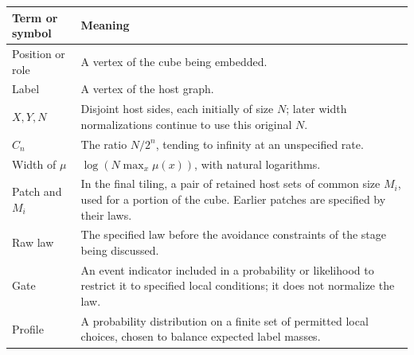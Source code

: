\begin{center}
\begin{tabular}{@{}p{.22\linewidth}p{.71\linewidth}@{}}
\toprule
Term or symbol & Meaning \\
\midrule
Position or role & A vertex of the cube being embedded. \\
Label & A vertex of the host graph. \\
$X,Y,N$ & Disjoint host sides, each initially of size $N$; later width
normalizations continue to use this original $N$. \\
$C_n$ & The ratio $N/2^n$, tending to infinity at an unspecified rate. \\
Width of $\mu$ & $\log(N\max_x\mu(x))$, with natural logarithms. \\
Patch and $M_i$ & In the final tiling, a pair of retained host sets of common
size $M_i$, used for a portion of the cube. Earlier patches are specified
by their laws. \\
Raw law & The specified law before the avoidance constraints of the stage
being discussed. \\
Gate & An event indicator included in a probability or likelihood to
restrict it to specified local conditions; it does not normalize the law. \\
Profile & A probability distribution on a finite set of permitted local
choices, chosen to balance expected label masses. \\
\bottomrule
\end{tabular}
\end{center}
